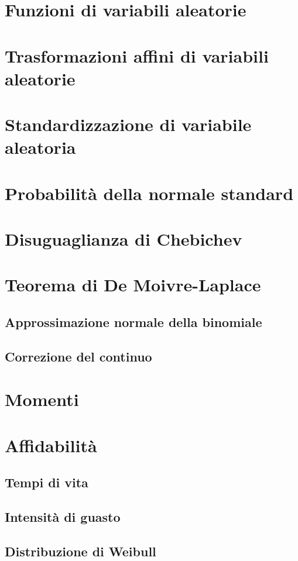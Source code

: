    \section{Funzioni di variabili aleatorie}
    \section{Trasformazioni affini di variabili aleatorie}
    \section{Standardizzazione di variabile aleatoria}
    \section{Probabilità della normale standard}
    \section{Disuguaglianza di Chebichev}
    \section{Teorema di De Moivre-Laplace}
        \subsection{Approssimazione normale della binomiale}
        \subsection*{Correzione del continuo}
    \section{Momenti}
    \section{Affidabilità}
        \subsection{Tempi di vita}
        \subsection{Intensità di guasto}
        \subsection{Distribuzione di Weibull}
